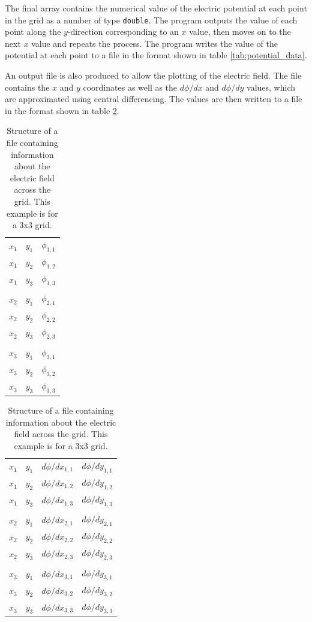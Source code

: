 The final array contains the numerical value of the electric potential at each point in the grid as a number of type \lstinline|double|. The program outputs the value of each point along the $y$-direction corresponding to an $x$ value, then moves on to the next $x$ value and repeats the process. The program writes the value of the potential at each point to a file in the format shown in table \ref{tab:potential_data}.

An output file is also produced to allow the plotting of the electric field. The file contains the $x$ and $y$ coordinates as well as the $d{\phi}/dx$ and $d{\phi}/dy$ values, which are approximated using central differencing. The values are then written to a file in the format shown in table \ref{tab:field_data}.
\begin{table}
\parbox{0.47\linewidth}{
\centering
\begin{tabularx}{0.44\textwidth}{ |XXX| }
\hline
$x_1$ & $y_1$ & $\phi_{1,1}$ \\
$x_1$ & $y_2$ & $\phi_{1,2}$ \\
$x_1$ & $y_3$ & $\phi_{1,3}$ \\
& & \\
$x_2$ & $y_1$ & $\phi_{2,1}$ \\
$x_2$ & $y_2$ & $\phi_{2,2}$ \\
$x_2$ & $y_3$ & $\phi_{2,3}$ \\
& & \\
$x_3$ & $y_1$ & $\phi_{3,1}$ \\
$x_3$ & $y_2$ & $\phi_{3,2}$ \\
$x_3$ & $y_3$ & $\phi_{3,3}$ \\
\hline
\end{tabularx}
\caption{Structure of a file containing information about the potential across the grid. This example is for a 3x3 grid.}
\label{tab:potential_data}
}
\hfill
\parbox{0.47\linewidth}{
\centering
\begin{tabularx}{0.44\textwidth}{ |XXXX| }
\hline
$x_1$ & $y_1$ & $d{\phi}/dx_{1,1}$ & $d{\phi}/dy_{1,1}$ \\
$x_1$ & $y_2$ & $d{\phi}/dx_{1,2}$ & $d{\phi}/dy_{1,2}$ \\
$x_1$ & $y_3$ & $d{\phi}/dx_{1,3}$ & $d{\phi}/dy_{1,3}$ \\
& & & \\
$x_2$ & $y_1$ & $d{\phi}/dx_{2,1}$ & $d{\phi}/dy_{2,1}$ \\
$x_2$ & $y_2$ & $d{\phi}/dx_{2,2}$ & $d{\phi}/dy_{2,2}$ \\
$x_2$ & $y_3$ & $d{\phi}/dx_{2,3}$ & $d{\phi}/dy_{2,3}$ \\
& & & \\
$x_3$ & $y_1$ & $d{\phi}/dx_{3,1}$ & $d{\phi}/dy_{3,1}$ \\
$x_3$ & $y_2$ & $d{\phi}/dx_{3,2}$ & $d{\phi}/dy_{3,2}$ \\
$x_3$ & $y_3$ & $d{\phi}/dx_{3,3}$ & $d{\phi}/dy_{3,3}$ \\
\hline
\end{tabularx}
\caption{Structure of a file containing information about the electric field across the grid. This example is for a 3x3 grid.}
\label{tab:field_data}
}
\end{table}
